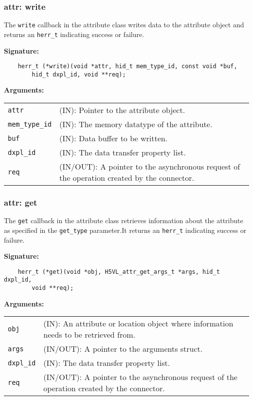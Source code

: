 \subsubsection{attr: write}
The \texttt{write} callback in the attribute class writes data to
the attribute object and returns an \texttt{herr\_t} indicating success or
failure.\bigskip

\begin{mdframed}[style=bgbox]
\textbf{Signature:}
\begin{lstlisting}
    herr_t (*write)(void *attr, hid_t mem_type_id, const void *buf, 
        hid_t dxpl_id, void **req);
\end{lstlisting}

\textbf{Arguments:}\\
\begin{tabular}{l p{13.5cm}}
  \texttt{attr} & (IN): Pointer to the attribute object.\\
  \texttt{mem\_type\_id} & (IN): The memory datatype of the attribute.\\
  \texttt{buf} & (IN): Data buffer to be written.\\
  \texttt{dxpl\_id} & (IN): The data transfer property list.\\
  \texttt{req} & (IN/OUT): A pointer to the asynchronous request of the
  operation created by the connector.\\
\end{tabular}
\end{mdframed}

\subsubsection{attr: get}
The \texttt{get} callback in the attribute class retrieves
information about the attribute as specified in the \texttt{get\_type}
parameter.It returns an \texttt{herr\_t} indicating success or failure.\bigskip

\begin{mdframed}[style=bgbox]
\textbf{Signature:}
\begin{lstlisting}
    herr_t (*get)(void *obj, H5VL_attr_get_args_t *args, hid_t dxpl_id, 
        void **req);
\end{lstlisting}

\textbf{Arguments:}\\
\begin{tabular}{l p{13.5cm}}
  \texttt{obj} & (IN): An attribute or location object where information
  needs to be retrieved from.\\
  \texttt{args} & (IN/OUT): A pointer to the arguments struct.\\
  \texttt{dxpl\_id} & (IN): The data transfer property list.\\
  \texttt{req} & (IN/OUT): A pointer to the asynchronous request of the
  operation created by the connector.\\
\end{tabular}
\end{mdframed}

